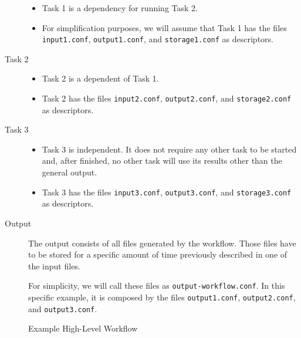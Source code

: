 \documentclass[a4paper, twocolumn]{article}
\begin{document}
\begin{description}
\begin{itemize}
\item Task 1 is a dependency for running Task 2.

\item For simplification purposes, we will assume that Task 1 has the files \texttt{input1.conf}, \texttt{output1.conf}, and \texttt{storage1.conf} as descriptors.

\end{itemize}

\item[Task 2]

\begin{itemize}

\item Task 2 is a dependent of Task 1.

\item Task 2 has the files \texttt{input2.conf}, \texttt{output2.conf}, and \texttt{storage2.conf} as descriptors.

\end{itemize}

\item[Task 3]

\begin{itemize}

\item Task 3 is independent. It does not require any other task to be started and, after finished, no other task will use its results other than the general output.

\item Task 3 has the files \texttt{input3.conf}, \texttt{output3.conf}, and \texttt{storage3.conf} as descriptors.

\end{itemize}

\item[Output]

The output consists of all files generated by the workflow. Those files have to be stored for a specific amount of time previously described in one of the input files.

For simplicity, we will call these files as \texttt{output-workflow.conf}. In this specific example, it is composed by the files \texttt{output1.conf}, \texttt{output2.conf}, and \texttt{output3.conf}.

\end{description}

\begin{figure}[b]
  \centering
  \caption{Example High-Level Workflow}
  \label{fig:workflow}
\end{figure}
\end{document}
